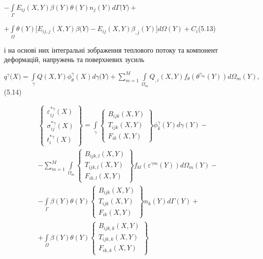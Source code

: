 ${- {\int\limits_{\Gamma}{E_{\mathit{\text{ij}}}(X,Y)\beta(Y)\theta(Y)n_{j}(Y)\mathit{d\Gamma}(Y{) +}}}}$

$+{{\int\limits_{\Omega}{\theta(Y)\lbrack E_{\mathit{\text{ij}},j}(X,Y)\beta(Y{) - E_{\mathit{\text{ij}}}}(X,Y)\beta_{,j}(Y)\rbrack d\Omega(Y)}} + C_{i}}$(5.13)

і на основі них інтегральні зображення теплового потоку та компонент деформацій, напружень та поверхневих зусиль

$q^{\gamma}(X{) = {\int\limits_{\gamma}{Q(X,Y)\phi_{\theta}^{\gamma}(X)\mathit{d\gamma}(Y{) + {\sum\limits_{m = 1}^{M}{{\int\limits_{\Omega_{m}}{Q_{,i}(X,Y)f_{\theta}(\theta^{\gamma_{m}}(Y))d\Omega_{m}{(Y)}}},}}}}}}$
(5.14)

\begin{equation*}
    \begin{split}
        \left\{ \begin{array}{lr} \varepsilon_{ij}^{*\gamma}(X) \\ \sigma_{ij}^{*\gamma}(X) \\ t_{i}^{*\gamma} (X) \end{array} \right \} =
        \int\limits_{\gamma} \left\{ \begin{array}{lr} B_{ijk}(X,Y) \\ T_{ijk}(X,Y) \\ F_{ik}(X,Y) \end{array} \right \}
            \phi_k^\gamma(Y)d\gamma(Y) - \\ - 
        \sum \limits_{m=1}^M \int \limits_{\Omega_m} \left\{ \begin{array}{lr} B_{ijk,l}(X,Y) \\ T_{ijk,l}(X,Y) \\ F_{ik,l}(X,Y) \end{array} \right \}
            f_{kl}(\varepsilon^{\gamma m}(Y))d\Omega_m(Y) - \\ -
        \int \limits_{\Gamma} \beta(Y) \theta(Y) \left\{ \begin{array}{lr} B_{ijk}(X,Y) \\ T_{ijk}(X,Y) \\ F_{ik}(X,Y) \end{array} \right \}
            n_k(Y)d\Gamma(Y) + \\ +
        \int \limits_{\Omega} \beta(Y) \theta(Y) \left\{ \begin{array}{lr} B_{ijk,k}(X,Y) \\ T_{ijk,k}(X,Y) \\ F_{ik,k}(X,Y) \end{array} \right \}

\end{split}
\end{equation*}
